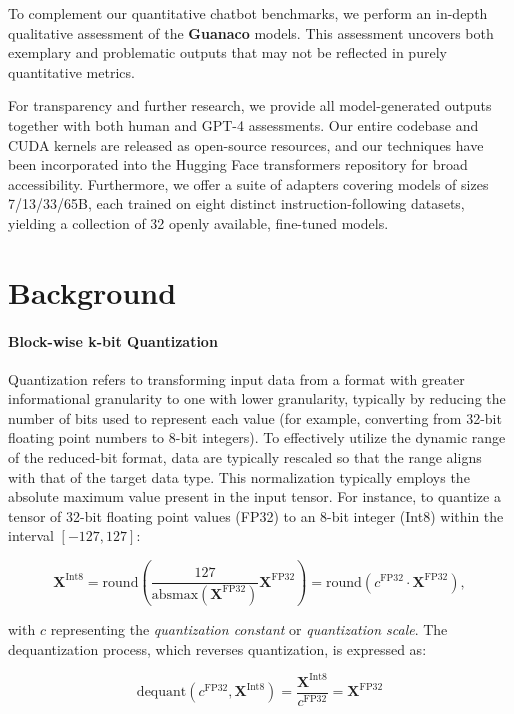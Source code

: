 To complement our quantitative chatbot benchmarks, we perform an in-depth qualitative assessment of the \textbf{Guanaco} models. This assessment uncovers both exemplary and problematic outputs that may not be reflected in purely quantitative metrics.

For transparency and further research, we provide all model-generated outputs together with both human and GPT-4 assessments. Our entire codebase and CUDA kernels are released as open-source resources, and our techniques have been incorporated into the Hugging Face transformers repository \citep{wolf2019huggingface} for broad accessibility. Furthermore, we offer a suite of adapters covering models of sizes 7/13/33/65B, each trained on eight distinct instruction-following datasets, yielding a collection of 32 openly available, fine-tuned models.

\section{Background}
\paragraph{Block-wise k-bit Quantization} Quantization refers to transforming input data from a format with greater informational granularity to one with lower granularity, typically by reducing the number of bits used to represent each value (for example, converting from 32-bit floating point numbers to 8-bit integers). To effectively utilize the dynamic range of the reduced-bit format, data are typically rescaled so that the range aligns with that of the target data type. This normalization typically employs the absolute maximum value present in the input tensor. For instance, to quantize a tensor of 32-bit floating point values (FP32) to an 8-bit integer (Int8) within the interval $[-127, 127]$:

\begin{equation}
    \mathbf{X}^{ \text{Int8}} = \text{round}\left( \frac{127}{{\text{absmax}}(\mathbf{X}^{{\text{FP32}}})}\mathbf{X}^{{\text{FP32}}} \right) = \text{round}(c^{\text{FP32}}\cdot \mathbf{X}^{{\text{FP32}}}),
\end{equation}

with $c$ representing the {\em quantization constant} or {\em quantization scale}. The dequantization process, which reverses quantization, is expressed as:

\begin{equation}
    \text{dequant}(c^{\text{FP32}}, \mathbf{X}^{\text{Int8}}) = \frac{\mathbf{X}^{\text{Int8}}}{c^{\text{FP32}}} = \mathbf{X}^{\text{FP32}}
\end{equation}


